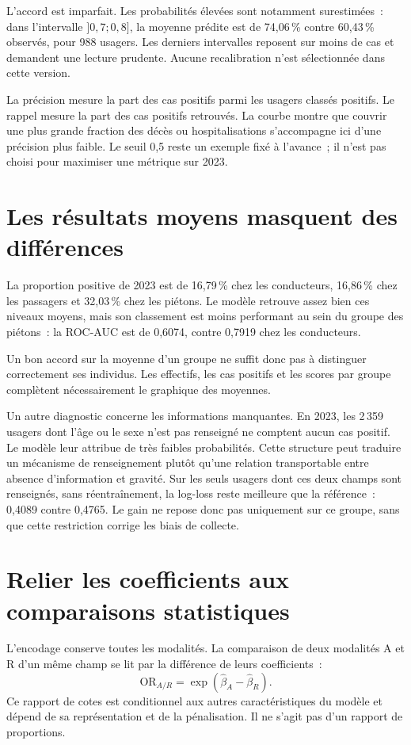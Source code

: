 L'accord est imparfait. Les probabilités élevées sont notamment surestimées~: dans
l'intervalle $]0{,}7;0{,}8]$, la moyenne prédite est de 74,06\,\% contre 60,43\,\%
observés, pour 988 usagers. Les derniers intervalles reposent sur moins de cas et
demandent une lecture prudente. Aucune recalibration n'est sélectionnée dans cette version.

La précision mesure la part des cas positifs parmi les usagers classés positifs.
Le rappel mesure la part des cas positifs retrouvés. La courbe montre que couvrir une
plus grande fraction des décès ou hospitalisations s'accompagne ici d'une précision
plus faible. Le seuil 0,5 reste un exemple fixé à l'avance~; il n'est pas choisi
pour maximiser une métrique sur 2023.

\section{Les résultats moyens masquent des différences}
La proportion positive de 2023 est de 16,79\,\% chez les conducteurs, 16,86\,\%
chez les passagers et 32,03\,\% chez les piétons. Le modèle retrouve assez bien ces
niveaux moyens, mais son classement est moins performant au sein du groupe des piétons~:
la ROC-AUC est de 0,6074, contre 0,7919 chez les conducteurs.

Un bon accord sur la moyenne d'un groupe ne suffit donc pas à distinguer correctement
ses individus. Les effectifs, les cas positifs et les scores par groupe complètent
nécessairement le graphique des moyennes.

Un autre diagnostic concerne les informations manquantes. En 2023, les 2\,359 usagers
dont l'âge ou le sexe n'est pas renseigné ne comptent aucun cas positif. Le modèle
leur attribue de très faibles probabilités. Cette structure peut traduire un mécanisme
de renseignement plutôt qu'une relation transportable entre absence d'information
et gravité. Sur les seuls usagers dont ces deux champs sont renseignés, sans
réentraînement, la log-loss reste meilleure que la référence~: 0,4089 contre 0,4765.
Le gain ne repose donc pas uniquement sur ce groupe, sans que cette restriction
corrige les biais de collecte.

\section{Relier les coefficients aux comparaisons statistiques}
L'encodage conserve toutes les modalités. La comparaison de deux modalités A et R
d'un même champ se lit par la différence de leurs coefficients~:
\[
  \mathrm{OR}_{A/R}=\exp(\widehat\beta_A-\widehat\beta_R).
\]
Ce rapport de cotes est conditionnel aux autres caractéristiques du modèle et dépend
de sa représentation et de la pénalisation. Il ne s'agit pas d'un rapport de proportions.


